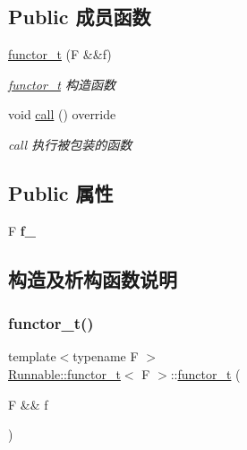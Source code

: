 \subsection*{Public 成员函数}
\begin{DoxyCompactItemize}
\item 
\hyperlink{structRunnable_1_1functor__t_a8125c5656f64c62ac856b0c4cbb2b1c6}{functor\+\_\+t} (F \&\&f)
\begin{DoxyCompactList}\small\item\em \hyperlink{structRunnable_1_1functor__t}{functor\+\_\+t} 构造函数 \end{DoxyCompactList}\item 
\mbox{\label{structRunnable_1_1functor__t_a404feeb85c1820746441eac72f511796}} 
void \hyperlink{structRunnable_1_1functor__t_a404feeb85c1820746441eac72f511796}{call} () override
\begin{DoxyCompactList}\small\item\em call 执行被包装的函数 \end{DoxyCompactList}\end{DoxyCompactItemize}
\subsection*{Public 属性}
\begin{DoxyCompactItemize}
\item 
\mbox{\label{structRunnable_1_1functor__t_ad0c111f247499208497940336bf4bf17}} 
F {\bfseries f\+\_\+}
\end{DoxyCompactItemize}


\subsection{构造及析构函数说明}
\mbox{\label{structRunnable_1_1functor__t_a8125c5656f64c62ac856b0c4cbb2b1c6}} 
\subsubsection{\texorpdfstring{functor\+\_\+t()}{functor\_t()}}
{\footnotesize\ttfamily template$<$typename F $>$ \\
\hyperlink{structRunnable_1_1functor__t}{Runnable\+::functor\+\_\+t}$<$ F $>$\+::\hyperlink{structRunnable_1_1functor__t}{functor\+\_\+t} (\begin{DoxyParamCaption}\item[{F \&\&}]{f }\end{DoxyParamCaption})\hspace{0.3cm}{\ttfamily [inline]}}




